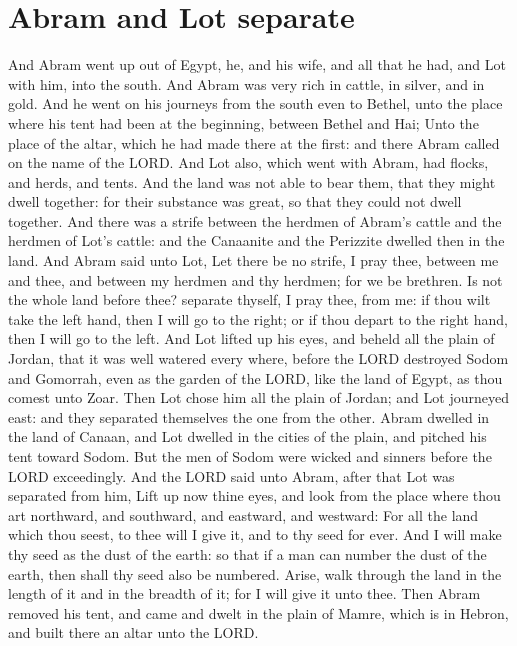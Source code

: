 \section*{Abram and Lot separate}
\begin{biblechapter} %
\verse And Abram went up out of Egypt, he, and his wife, and all that he had, and Lot with him, into the south.
\verse And Abram was very rich in cattle, in silver, and in gold.
\verse And he went on his journeys from the south even to Bethel, unto the place where his tent had been at the beginning, between Bethel and Hai;
\verse Unto the place of the altar, which he had made there at the first: and there Abram called on the name of the LORD.
\verse And Lot also, which went with Abram, had flocks, and herds, and tents.
\verse And the land was not able to bear them, that they might dwell together: for their substance was great, so that they could not dwell together.
\verse And there was a strife between the herdmen of Abram's cattle and the herdmen of Lot's cattle: and the Canaanite and the Perizzite dwelled then in the land.
\verse And Abram said unto Lot, Let there be no strife, I pray thee, between me and thee, and between my herdmen and thy herdmen; for we be brethren.
\verse Is not the whole land before thee? separate thyself, I pray thee, from me: if thou wilt take the left hand, then I will go to the right; or if thou depart to the right hand, then I will go to the left.
\verse And Lot lifted up his eyes, and beheld all the plain of Jordan, that it was well watered every where, before the LORD destroyed Sodom and Gomorrah, even as the garden of the LORD, like the land of Egypt, as thou comest unto Zoar.
\verse Then Lot chose him all the plain of Jordan; and Lot journeyed east: and they separated themselves the one from the other.
\verse Abram dwelled in the land of Canaan, and Lot dwelled in the cities of the plain, and pitched his tent toward Sodom.
\verse But the men of Sodom were wicked and sinners before the LORD exceedingly.
\verse And the LORD said unto Abram, after that Lot was separated from him, Lift up now thine eyes, and look from the place where thou art northward, and southward, and eastward, and westward:
\verse For all the land which thou seest, to thee will I give it, and to thy seed for ever.
\verse And I will make thy seed as the dust of the earth: so that if a man can number the dust of the earth, then shall thy seed also be numbered.
\verse Arise, walk through the land in the length of it and in the breadth of it; for I will give it unto thee.
\verse Then Abram removed his tent, and came and dwelt in the plain of Mamre, which is in Hebron, and built there an altar unto the LORD.
\end{biblechapter}

